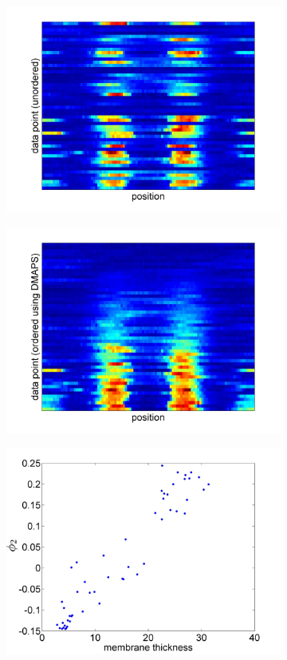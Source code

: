 \documentclass[10pt]{article}
\begin{document}
\begin{figure}[H]
\begin{subfigure}{0.3\textwidth}
\includegraphics[width=\textwidth]{data_unordered}
\caption{}
\end{subfigure}
\begin{subfigure}{0.3\textwidth}
\includegraphics[width=\textwidth]{data_ordered_DMAPS}
\caption{}
\end{subfigure}
\begin{subfigure}{0.3\textwidth}
\includegraphics[width=\textwidth]{DMAPS_time_corr}

\end{subfigure}
\end{figure}
\end{document}
